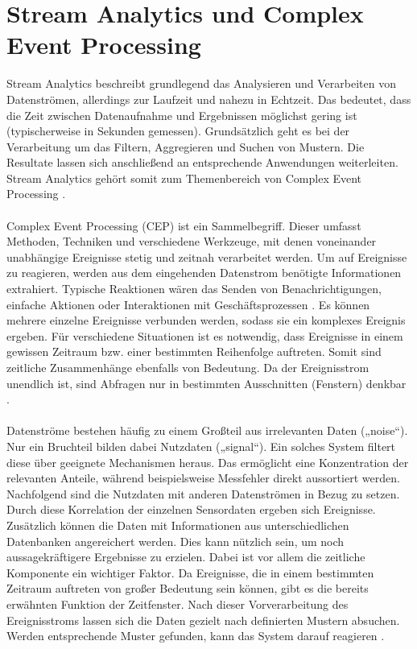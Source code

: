 \section{Stream Analytics und Complex Event Processing}
Stream Analytics beschreibt grundlegend das Analysieren und Verarbeiten von Datenströmen, allerdings zur Laufzeit und nahezu in Echtzeit. Das bedeutet, dass die Zeit zwischen Datenaufnahme und Ergebnissen möglichst gering ist (typischerweise in Sekunden gemessen). Grundsätzlich geht es bei der Verarbeitung um das Filtern, Aggregieren und Suchen von Mustern. Die Resultate lassen sich anschließend an entsprechende Anwendungen weiterleiten. Stream Analytics gehört somit zum Themenbereich von Complex Event Processing \cite{GesellschaftfurInformatik.2009}.\\ \\ 
Complex Event Processing (CEP) ist ein Sammelbegriff. Dieser umfasst Methoden, Techniken und verschiedene Werkzeuge, mit denen voneinander unabhängige Ereignisse stetig und zeitnah verarbeitet werden. Um auf Ereignisse zu reagieren, werden aus dem eingehenden Datenstrom benötigte Informationen extrahiert. Typische Reaktionen wären das Senden von Benachrichtigungen, einfache Aktionen oder Interaktionen mit Geschäftsprozessen \cite{GesellschaftfurInformatik.2009}. Es können mehrere einzelne Ereignisse verbunden werden, sodass sie ein komplexes Ereignis ergeben. Für verschiedene Situationen ist es notwendig, dass Ereignisse in einem gewissen Zeitraum bzw. einer bestimmten Reihenfolge auftreten. Somit sind zeitliche Zusammenhänge ebenfalls von Bedeutung. Da der Ereignisstrom unendlich ist, sind Abfragen nur in bestimmten Ausschnitten (Fenstern) denkbar \cite{GesellschaftfurInformatik.2009}. \\ \\
Datenströme bestehen häufig zu einem Großteil aus irrelevanten Daten („noise“). Nur ein Bruchteil bilden dabei Nutzdaten („signal“). Ein solches System filtert diese über geeignete Mechanismen heraus. Das ermöglicht eine Konzentration der relevanten Anteile, während beispielsweise Messfehler direkt aussortiert werden. Nachfolgend sind die Nutzdaten mit anderen Datenströmen in Bezug zu setzen. Durch diese Korrelation der einzelnen Sensordaten ergeben sich Ereignisse. Zusätzlich können die Daten mit Informationen aus unterschiedlichen Datenbanken angereichert werden. Dies kann nützlich sein, um noch aussagekräftigere Ergebnisse zu erzielen. Dabei ist vor allem die zeitliche Komponente ein wichtiger Faktor. Da Ereignisse, die in einem bestimmten Zeitraum auftreten von großer Bedeutung sein können, gibt es die bereits erwähnten Funktion der Zeitfenster. Nach dieser Vorverarbeitung des Ereignisstroms lassen sich die Daten gezielt nach definierten Mustern absuchen. Werden entsprechende Muster gefunden, kann das System darauf reagieren \cite{Bruening.2016} \cite{}.



\ifCLASSOPTIONcaptionsoff
  \newpage
\fi